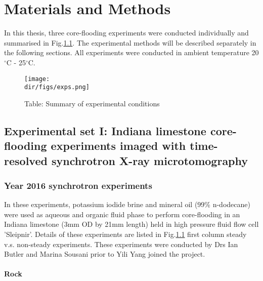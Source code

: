 
\chapter{Materials and Methods}

In this thesis, three core-flooding experiments were conducted individually and summarised in Fig.\ref{exps}. The experimental methods will be described separately in the following sections. All experiments were conducted in ambient temperature 20$^{\circ}$C - 25$^{\circ}$C.

\begin{figure}[htbp]
  \centering
  \texttt{[image: \\dir/figs/exps.png]}
  \caption{Table: Summary of experimental conditions}
  \label{exps}
\end{figure}

\section{Experimental set I: Indiana limestone core-flooding experiments imaged with time-resolved synchrotron X-ray microtomography }
\label{2016}
\subsection{Year 2016 synchrotron experiments}
In these experiments, potassium iodide brine and mineral oil (99\% n-dodecane) were used as aqueous and organic fluid phase to perform core-flooding in an Indiana limestone (3mm OD by 21mm length) held in high pressure fluid flow cell 'Sleipnir'. Details of these experiments are listed in Fig.\ref{exps} first column steady v.s. non-steady experiments. These experiments were conducted by Drs Ian Butler and Marina Sousani prior to Yili Yang joined the project.

\subsubsection{Rock}
